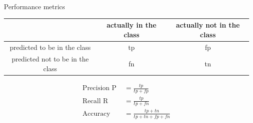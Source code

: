 \documentclass[serif, aspectratio=169]{beamer}
\begin{document}
\begin{frame}{Performance metrics}
    
    
    \begin{table}[h!]
    \centering
    \begin{tabular}{|c|c|c|}
        \hline
         & actually in the class & actually not in the  class \\ \hline
        predicted to be in the class & tp & fp \\ \hline
        predicted not to be in the class & fn & tn \\ \hline
    \end{tabular}
    \end{table}
    
    
    \begin{align*}
        \text{Precision P } &= \frac{tp}{tp + fp} \\
        \text{Recall R } &= \frac{tp}{tp + fn} \\
        \text{Accuracy } &= \frac{tp + tn}{tp + tn + fp + fn}
    \end{align*}
\end{frame}
\end{document}
